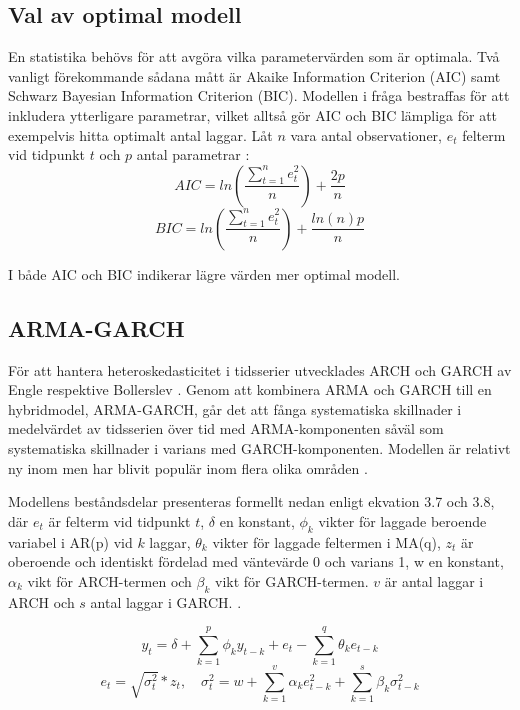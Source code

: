 \documentclass[11pt]{article}
\numberwithin{equation}{section}
\numberwithin{table}{section}
\numberwithin{figure}{section}
\begin{document}
\subsection{Val av optimal modell}
En statistika behövs för att avgöra vilka parametervärden som är optimala. Två vanligt förekommande sådana mått är Akaike Information Criterion (AIC) samt Schwarz Bayesian Information Criterion (BIC). Modellen i fråga bestraffas för att inkludera ytterligare parametrar, vilket alltså gör AIC och BIC lämpliga för att exempelvis hitta optimalt antal laggar. Låt $n$ vara antal observationer, $e_t$ felterm vid tidpunkt $t$ och $p$ antal parametrar \parencite[][s.76 f.]{montgomery2015forecasting}:
\begin{equation}
    AIC = ln\left( \frac{\sum_{t=1}^{n}e^2_t}{n} \right)+\frac{2p}{n}
\end{equation}
\begin{equation}
    BIC = ln\left( \frac{\sum_{t=1}^{n}e^2_t}{n} \right)+\frac{ln(n)p}{n}
\end{equation}

I både AIC och BIC indikerar lägre värden mer optimal modell. 

\subsection{ARMA-GARCH}
För att hantera heteroskedasticitet i tidsserier utvecklades ARCH och GARCH av Engle \parencite*{engle1982autoregressive} respektive Bollerslev \parencite*{bollerslev1986generalized}. Genom att kombinera ARMA och GARCH till en hybridmodel, ARMA-GARCH, går det att fånga systematiska skillnader i medelvärdet av tidsserien över tid med ARMA-komponenten såväl som systematiska skillnader i varians med GARCH-komponenten. Modellen är relativt ny inom men har blivit populär inom flera olika områden \parencite{chen2011short}. 

Modellens beståndsdelar presenteras formellt nedan enligt ekvation 3.7 och 3.8, där \(e_t\) är felterm vid tidpunkt $t$, \(\delta\) en konstant, \(\phi_k\) vikter för laggade beroende variabel i AR(p) vid $k$ laggar, \(\theta_k\) vikter för laggade feltermen i MA(q), \(z_t\) är oberoende och identiskt fördelad med väntevärde 0 och varians 1, w en konstant, \(\alpha_k\) vikt för ARCH-termen och \(\beta_k\) vikt för GARCH-termen. $v$ är antal laggar i ARCH och $s$ antal laggar i GARCH. \parencite[][,s.507 ff.]{bollerslev1986generalized, montgomery2015forecasting}.

\begin{equation}
    y_t = \delta + \sum_{k=1}^{p}\phi_k y_{t-k}  +e_t - \sum_{k=1}^{q}\theta_k e_{t-k} 
\end{equation}
\begin{equation}
    e_t=\sqrt{\sigma_t^2}*z_t,\quad \sigma^2_t=w + \sum_{k=1}^{v}\alpha_k e^2_{t-k} + \sum_{k=1}^{s}\beta_k \sigma^2_{t-k}
\end{equation}
\end{document}

